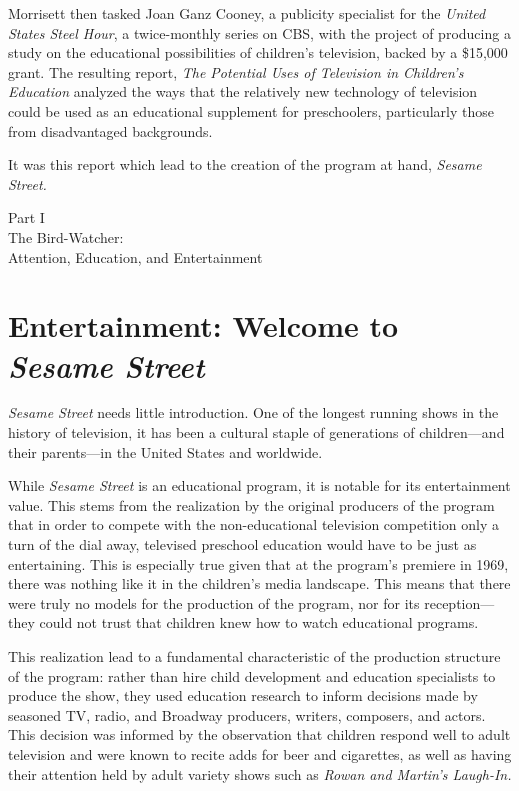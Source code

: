 \documentclass[12pt,letterpaper]{article}
\begin{document}
	Morrisett then tasked Joan Ganz Cooney, a publicity specialist for the 
	\textit{United States Steel Hour}, a twice-monthly series on CBS, 
	\autocite[27]{Davis} with the project of producing a study
	on the educational possibilities of children's television, backed by a
	\$15,000 grant. The resulting report, \textit{The Potential Uses of 
	Television in Children's Education} analyzed the ways that the
	relatively new technology of television could be used as an educational
	supplement for preschoolers, particularly those from disadvantaged 
	backgrounds.

	It was this report which lead to the creation of the program at hand, 
	\textit{Sesame Street.}


	\newpage
	\thispagestyle{empty}
	\vspace*{30pt}
	\begin{center}
	{\Huge Part I\\ 
	\Large The Bird-Watcher:\\
	Attention, Education, and Entertainment}
	\end{center}
	\newpage

	\section*{Entertainment: Welcome to \textit{Sesame Street}}

	\noindent\textit{Sesame Street} needs little introduction. One of the
	longest
	running shows in the history of television,\autocite{Brit} it has been a 
	cultural staple of generations of children---and their parents---in the 
	United States and worldwide.
	
	While \textit{Sesame Street} is an educational program, it is notable 
	for its entertainment value. This stems from the realization by the 
	original producers of the program that in order to compete with the 
	non-educational television competition only a turn of the dial away,
	televised preschool education would have to be just as 
	entertaining.\autocite[38]{Cooney} This is especially true given that
	at the program's premiere in 1969, there was nothing like it in the 
	children's media landscape.\autocite[See chapter 3 for a survey of the 
	contemporary children's television landscape]{Davis} This means that 
	there were truly no models for the production of the program, nor for 
	its
	reception---they could not trust that children knew how to watch
	educational programs.  

	This realization lead to a fundamental characteristic of the production
	structure of the program: rather than hire child development and 
	education specialists to produce the show, they used education research
	to inform decisions made by seasoned TV, radio, and Broadway producers,
	writers, composers, and actors. This decision was informed by the 
	observation
	that children respond well to adult television and were known to recite
	adds for beer and cigarettes, as well as having their attention held by
	adult variety shows such as \textit{Rowan and Martin's Laugh-In.}
	\autocite[16]{Ostrofsky2012}
\end{document}
